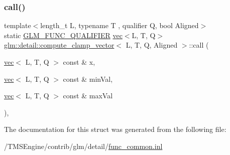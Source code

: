 \subsubsection{\texorpdfstring{call()}{call()}}
{\footnotesize\ttfamily template$<$length\+\_\+t L, typename T , qualifier Q, bool Aligned$>$ \\
static \hyperlink{setup_8hpp_a33fdea6f91c5f834105f7415e2a64407}{G\+L\+M\+\_\+\+F\+U\+N\+C\+\_\+\+Q\+U\+A\+L\+I\+F\+I\+ER} \hyperlink{structglm_1_1vec}{vec}$<$L, T, Q$>$ \hyperlink{structglm_1_1detail_1_1compute__clamp__vector}{glm\+::detail\+::compute\+\_\+clamp\+\_\+vector}$<$ L, T, Q, Aligned $>$\+::call (\begin{DoxyParamCaption}\item[{\hyperlink{structglm_1_1vec}{vec}$<$ L, T, Q $>$ const \&}]{x,  }\item[{\hyperlink{structglm_1_1vec}{vec}$<$ L, T, Q $>$ const \&}]{min\+Val,  }\item[{\hyperlink{structglm_1_1vec}{vec}$<$ L, T, Q $>$ const \&}]{max\+Val }\end{DoxyParamCaption})\hspace{0.3cm}{\ttfamily [inline]}, {\ttfamily [static]}}



The documentation for this struct was generated from the following file\+:\begin{DoxyCompactItemize}
\item 
/\+T\+M\+S\+Engine/contrib/glm/detail/\hyperlink{func__common_8inl}{func\+\_\+common.\+inl}\end{DoxyCompactItemize}
